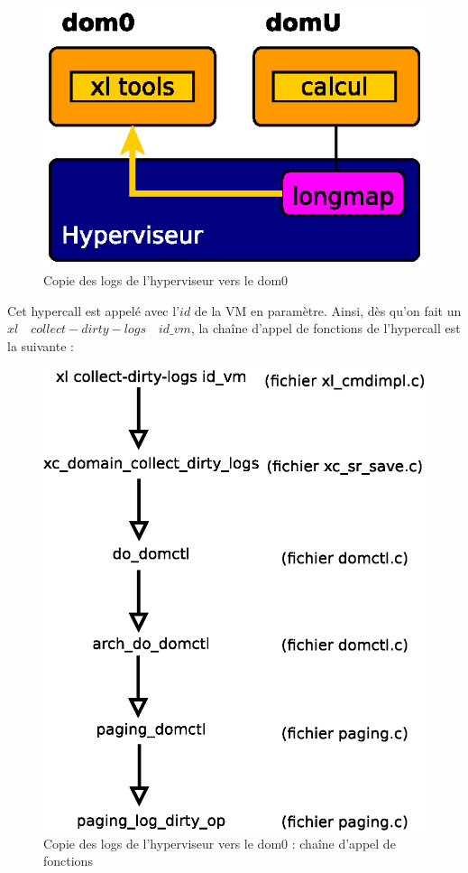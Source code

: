 \begin{figure}[H]
    \centering
    \includegraphics[scale=.8]{chapters/4/fig4/collect-dirty-logs}
    \caption{Copie des logs de l'hyperviseur vers le dom0}
    \label{fig:collect-dirty-logs}
\end{figure}

\noindent Cet hypercall est appelé avec l'$id$ de la VM en paramètre. Ainsi, dès qu'on fait un $xl \quad collect-dirty-logs \quad id\_vm$, la chaîne d'appel de fonctions de l'hypercall  est la suivante :
\begin{figure}[H]
    \centering
    \includegraphics[scale=.6]{chapters/4/fig4/collect-dirty-logs_appel_fonction}
    \caption{Copie des logs de l'hyperviseur vers le dom0 : chaîne d'appel de fonctions}
    \label{fig:collect-dirty-logs_appel_fonction}
\end{figure}

